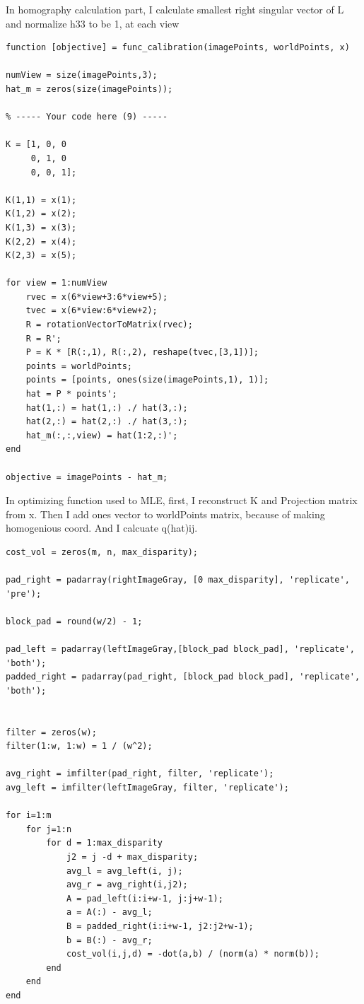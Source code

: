 In homography calculation part, I calculate smallest right singular vector of L and normalize h33 to be 1, at each view



\begin{lstlisting}[style=Matlab-editor]
function [objective] = func_calibration(imagePoints, worldPoints, x)
    
numView = size(imagePoints,3);
hat_m = zeros(size(imagePoints));

% ----- Your code here (9) -----

K = [1, 0, 0
     0, 1, 0
     0, 0, 1];
 
K(1,1) = x(1);
K(1,2) = x(2);
K(1,3) = x(3);
K(2,2) = x(4);
K(2,3) = x(5);

for view = 1:numView
    rvec = x(6*view+3:6*view+5);
    tvec = x(6*view:6*view+2);
    R = rotationVectorToMatrix(rvec);
    R = R';
    P = K * [R(:,1), R(:,2), reshape(tvec,[3,1])];
    points = worldPoints;
    points = [points, ones(size(imagePoints,1), 1)];
    hat = P * points';
    hat(1,:) = hat(1,:) ./ hat(3,:);
    hat(2,:) = hat(2,:) ./ hat(3,:);
    hat_m(:,:,view) = hat(1:2,:)';
end

objective = imagePoints - hat_m;
\end{lstlisting}

In optimizing function used to MLE, first, I reconstruct K and Projection matrix from x. Then I add ones vector to worldPoints matrix, because of making homogenious coord. And I calcuate q(hat)ij.

\begin{lstlisting}[style=Matlab-editor]
cost_vol = zeros(m, n, max_disparity);

pad_right = padarray(rightImageGray, [0 max_disparity], 'replicate', 'pre');

block_pad = round(w/2) - 1;

pad_left = padarray(leftImageGray,[block_pad block_pad], 'replicate', 'both');
padded_right = padarray(pad_right, [block_pad block_pad], 'replicate', 'both');


filter = zeros(w);
filter(1:w, 1:w) = 1 / (w^2);

avg_right = imfilter(pad_right, filter, 'replicate');
avg_left = imfilter(leftImageGray, filter, 'replicate');

for i=1:m
    for j=1:n
        for d = 1:max_disparity
            j2 = j -d + max_disparity;
            avg_l = avg_left(i, j);
            avg_r = avg_right(i,j2);
            A = pad_left(i:i+w-1, j:j+w-1);
            a = A(:) - avg_l;
            B = padded_right(i:i+w-1, j2:j2+w-1);
            b = B(:) - avg_r;
            cost_vol(i,j,d) = -dot(a,b) / (norm(a) * norm(b));
        end
    end
end
\end{lstlisting}

